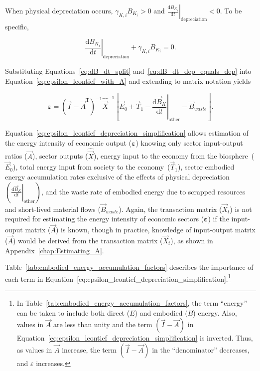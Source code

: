 \noindent{}When physical depreciation occurs,
$\gamma_{K,i} B_{K_{i}} > 0$ and 
$\left. \frac{\mathrm{d}B_{K_{i}}}{\mathrm{d}t} \right|_{\mathrm{depreciation}} < 0$.
To be specific,

\begin{equation} \label{eq:dB_dt_dep_equals_dep}
	\left. \frac{\mathrm{d}B_{K_{i}}}{\mathrm{d}t} \right|_{\mathrm{depreciation}} 
	+ \gamma_{K,i} B_{K_{i}}
	= 0.
\end{equation}

\noindent{}Substituting Equations~\ref{eq:dB_dt_split} and~\ref{eq:dB_dt_dep_equals_dep}
into Equation~\ref{eq:epsilon_leontief_with_A} and extending to matrix notation yields

\begin{equation} \label{eq:epsilon_leontief_depreciation_simplification}
	\boldsymbol{\varepsilon} 
	= {(\vec{I} - \vec{A}^{\mathrm{T}})}^{-1}\hat{\vec{X}}^{-1}
		\left[\vec{E}_{0} 
				+ \vec{T}_{1} 
				- \left. \frac{\mathrm{d}\vec{B}_{K}}{\mathrm{d}t} \right|_{\mathrm{other}}
				- \vec{B}_{waste}
		\right].
\end{equation}

\noindent{}Equation~\ref{eq:epsilon_leontief_depreciation_simplification} 
allows estimation of the energy intensity 
of economic output ($\boldsymbol{\varepsilon}$) 
knowing only 
sector input-output ratios ($\vec{A}$), 
sector outputs ($\hat{\vec{X}}$), 
energy input to the economy from the biosphere~($\vec{E}_{0}$), 
total energy input from society to the economy~($\vec{T}_{1}$),
sector embodied energy accumulation rates
exclusive of the effects of physical
depreciation~$\left( \left. \frac{\mathrm{d}\vec{B}_{K}}{\mathrm{d}t} \right|_{\mathrm{other}} \right)$,
and the waste rate of embodied energy due to scrapped resources and short-lived material flows
($\vec{B}_{waste}$).
Again, the transaction matrix ($\vec{X}_{t}$) 
is not required for estimating the energy intensity 
of economic sectors ($\boldsymbol{\varepsilon}$)
if the input-ouput matrix ($\vec{A}$) is known, 
though in practice, 
knowledge of input-output matrix ($\vec{A}$) 
would be derived from the transaction matrix ($\vec{X}_{t}$),
as shown in Appendix~\ref{chap:Estimating_A}.

Table~\ref{tab:embodied_energy_accumulation_factors} 
describes the importance of each term in 
Equation~\ref{eq:epsilon_leontief_depreciation_simplification}.\footnote{In
Table~\ref{tab:embodied_energy_accumulation_factors}, the term ``energy'' can be 
taken to include both direct ($\dot{E}$) and embodied ($\dot{B}$) energy.
Also, values in $\vec{A}$ are less than unity 
and the term $(\vec{I} - \vec{A})$ 
in Equation~\ref{eq:epsilon_leontief_depreciation_simplification} 
is inverted. 
Thus, as values in $\vec{A}$ increase, 
the term $(\vec{I} - \vec{A})$ in the ``denominator'' decreases, 
and $\varepsilon$ increases.} 

